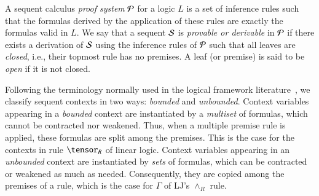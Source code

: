 \documentclass{new_tlp}
\begin{document}
A sequent calculus \emph{proof system} $\Pscr$ for a logic $L$ is a set of
inference rules such that the formulas derived by the application of these rules
are exactly the formulas valid in $L$. We say that a sequent $\Sscr$ is
\emph{provable or derivable} in $\Pscr$ if there exists a derivation of $\Sscr$ using the
inference rules of $\Pscr$ such that all leaves are \emph{closed}, i.e., their
topmost rule has no premises. A leaf (or premise) is said to be \emph{open} if
it is not closed.

Following the terminology normally used in the logical framework 
literature~\cite{nigam10jar,cervesato02ic}, we classify sequent contexts in two ways: 
\emph{bounded} and \emph{unbounded}. 
Context variables appearing in a \emph{bounded} context are instantiated by 
a \emph{multiset} of formulas, which
cannot be contracted nor weakened. Thus, when a multiple premise rule is
applied, these formulas are split among the premises. This is the case for the
contexts in rule $\tensor_R$ of linear logic.
Context variables appearing in an \emph{unbounded} context are instantiated by 
\emph{sets} of formulas, which
can be contracted or weakened as much as needed. Consequently, they are copied
among the premises of a rule, which is the case for $\Gamma$ of LJ's $\land_R$
rule.

% 
\end{document}

